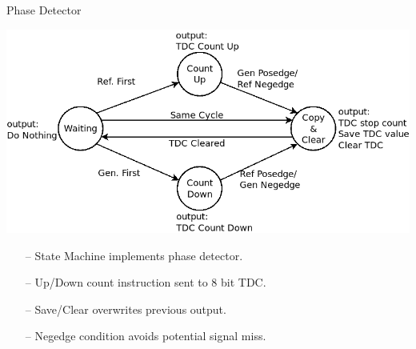 \documentclass{beamer}
\begin{document}
\begin{frame}{Phase Detector}
    \vspace{-0.67 cm}
    \begin{center}
        \includegraphics[scale=0.35]{../state_trans_diagram.png}
 	\end{center}
    \vspace{-0.1 cm}
	\begin{itemize}
        \item[--]
            State Machine implements phase detector.
        \item[--]
            Up/Down count instruction sent to 8 bit TDC.
        \item[--]
            Save/Clear overwrites previous output.
        \item[--]
            Negedge condition avoids potential signal miss.
    \end{itemize}
\end{frame}
\end{document}

